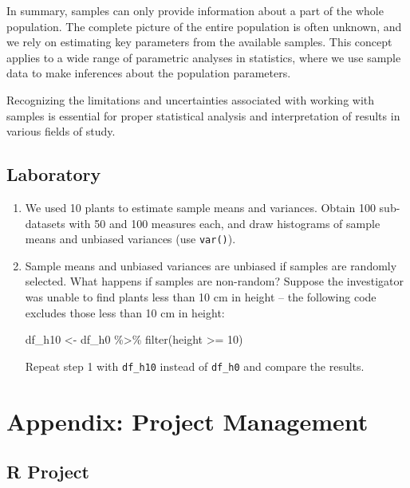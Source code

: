 \documentclass[
]{book}
\newenvironment{Shaded}{\begin{snugshade}}{\end{snugshade}}
\newcommand{\DecValTok}[1]{\textcolor[rgb]{0.00,0.00,0.81}{#1}}
\newcommand{\FunctionTok}[1]{\textcolor[rgb]{0.00,0.00,0.00}{#1}}
\newcommand{\NormalTok}[1]{#1}
\newcommand{\OtherTok}[1]{\textcolor[rgb]{0.56,0.35,0.01}{#1}}
\newcommand{\SpecialCharTok}[1]{\textcolor[rgb]{0.00,0.00,0.00}{#1}}
\begin{document}
In summary, samples can only provide information about a part of the whole population. The complete picture of the entire population is often unknown, and we rely on estimating key parameters from the available samples. This concept applies to a wide range of parametric analyses in statistics, where we use sample data to make inferences about the population parameters.

Recognizing the limitations and uncertainties associated with working with samples is essential for proper statistical analysis and interpretation of results in various fields of study.

\hypertarget{laboratory-1}{%
\section{Laboratory}\label{laboratory-1}}

\begin{enumerate}
\def\labelenumi{\arabic{enumi}.}
\item
  We used 10 plants to estimate sample means and variances. Obtain 100 sub-datasets with 50 and 100 measures each, and draw histograms of sample means and unbiased variances (use \texttt{var()}).
\item
  Sample means and unbiased variances are unbiased if samples are randomly selected. What happens if samples are non-random? Suppose the investigator was unable to find plants less than 10 cm in height -- the following code excludes those less than 10 cm in height:

\begin{Shaded}
\begin{Highlighting}[]
\NormalTok{df\_h10 }\OtherTok{\textless{}{-}}\NormalTok{ df\_h0 }\SpecialCharTok{\%\textgreater{}\%} 
  \FunctionTok{filter}\NormalTok{(height }\SpecialCharTok{\textgreater{}=} \DecValTok{10}\NormalTok{)}
\end{Highlighting}
\end{Shaded}

  Repeat step 1 with \texttt{df\_h10} instead of \texttt{df\_h0} and compare the results.
\end{enumerate}

\hypertarget{appendix-project-management}{%
\chapter{Appendix: Project Management}\label{appendix-project-management}}

\hypertarget{r-project}{%
\section{R Project}\label{r-project}}
\end{document}
